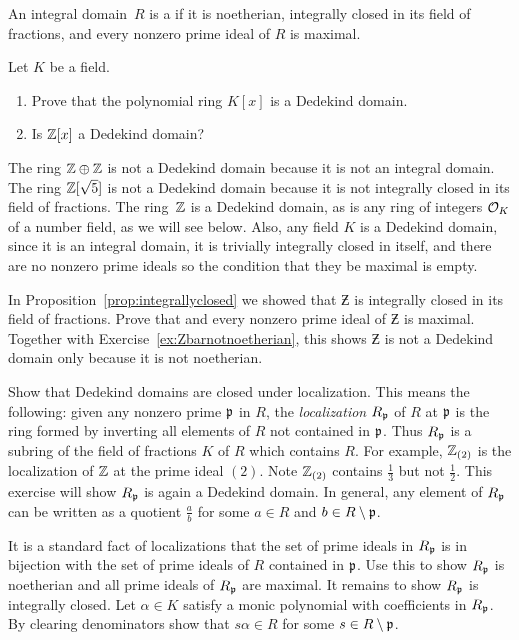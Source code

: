\begin{definition}
	An integral domain~$R$ is a  if it is noetherian,
	integrally closed in its field of fractions, and every nonzero prime
	ideal of $R$ is maximal.
\end{definition}

\begin{exercise}
	Let $K$ be a field.
	\begin{enumerate}
		\item Prove that the polynomial ring $K[x]$ is a Dedekind domain.
		\item Is $\mathbb{Z}[x]$ a Dedekind domain?
	\end{enumerate}
\end{exercise}

The ring $\mathbb{Z}\oplus \mathbb{Z}$ is not a Dedekind domain because it is not an
integral domain.  The ring $\mathbb{Z}[\sqrt{5}]$ is not a Dedekind domain
because it is not integrally closed in its field of fractions.  The
ring~$\mathbb{Z}$ is a Dedekind domain, as is any ring of integers $\mathcal{O}_K$ of a
number field, as we will see below.  Also, any field $K$ is a Dedekind
domain, since it is an integral domain, it is trivially integrally
closed in itself, and there are no nonzero prime ideals so the
condition that they be maximal is empty.

\begin{exercise}
	In Proposition~\ref{prop:integrallyclosed} we showed
	that $\Zbar$ is integrally closed in its field of fractions.
	Prove that and every nonzero prime ideal of $\Zbar$
	is maximal. Together with Exercise~\ref{ex:Zbarnotnoetherian},
	this shows $\Zbar$ is not a Dedekind domain only because it
	is not noetherian.
\end{exercise}

\begin{exercise}\label{ex:dedekindlocal}
	Show that Dedekind domains are closed under
	localization. This means the following: given
	any nonzero prime $\mathfrak{p}$ in $R$, the \emph{localization}
	$R_{\mathfrak{p}}$ of $R$ at $\mathfrak{p}$ is the ring formed by inverting all
	elements of $R$ not contained in $\mathfrak{p}$. Thus $R_{\mathfrak{p}}$ is a
	subring of the field of fractions $K$ of $R$ which contains
	$R$. For example, $\mathbb{Z}_{(2)}$ is the localization of $\mathbb{Z}$
	at the prime ideal $(2)$. Note $\mathbb{Z}_{(2)}$ contains
	$\frac{1}{3}$ but not $\frac{1}{2}$.
	This exercise will show $R_{\mathfrak{p}}$ is again a Dedekind domain.
	In general, any element of $R_{\mathfrak{p}}$ can be written as a quotient
	$\frac{a}{b}$ for some $a\in R$ and $b\in R\setminus \mathfrak{p}$.

	\begin{hint}
		It is a standard fact of localizations that the
		set of prime ideals in $R_{\mathfrak{p}}$ is in bijection with the set
		of prime ideals of $R$ contained in $\mathfrak{p}$. Use this to show
		$R_{\mathfrak{p}}$ is noetherian and all prime ideals of $R_{\mathfrak{p}}$ are maximal.
		It remains to show $R_{\mathfrak{p}}$ is integrally closed. Let $\alpha\in K$
		satisfy a monic polynomial with coefficients in $R_{\mathfrak{p}}$. By
		clearing denominators show that $s\alpha\in R$ for some
		$s\in R\setminus \mathfrak{p}$.
	\end{hint}
\end{exercise}


